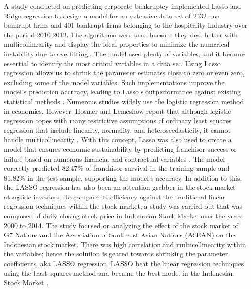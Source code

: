 A study conducted on predicting corporate bankruptcy implemented Lasso and Ridge regression to design a model for an extensive data set of 2032 non-bankrupt firms and 401 bankrupt firms belonging to the hospitality industry over the period 2010-2012. The algorithms were used because they deal better with multicollinearity and display the ideal properties to minimize the numerical instability due to overfitting \cite{pereira2016logistic}. The model used plenty of variables, and it became essential to identify the most critical variables in a data set. Using Lasso regression allows us to shrink the parameter estimates close to zero or even zero, excluding some of the model variables. Such implementations improve the model's prediction accuracy, leading to Lasso's outperformance against existing statistical methods \cite{wang2018predicting}. Numerous studies widely use the logistic regression method in economics. However, Hosmer and Lemeshow report that although logistic regression copes with many restrictive assumptions of ordinary least squares regression that include linearity, normality, and heteroscedasticity, it cannot handle multicollinearity \cite{hosmer2013applied}. With this concept, Lasso was also used to create a model that ensures economic sustainability by predicting franchisor success or failure based on numerous financial and contractual variables \cite{calderon2017economic}. The model correctly predicted 82.47\% of franchisor survival in the training sample and 81.82\% in the test sample, supporting the model's accuracy. In addition to this, the LASSO regression has also been an attention-grabber in the stock-market alongside investors. To compare its efficiency against the traditional linear regression techniques within the stock market, a study was carried out that was composed of daily closing stock price in Indonesian Stock Market over the years 2000 to 2014. The study focused on analyzing the effect of the stock market of G7 Nations and the Association of Southeast Asian Nations (ASEAN) on the Indonesian stock market. There was high correlation and multicollinearity within the variables; hence the solution is geared towards shrinking the parameter coefficients, aka LASSO regression. LASSO beat the linear regression techniques using the least-squares method and became the best model in the Indonesian Stock Market \cite{setiawan2018lasso}.

